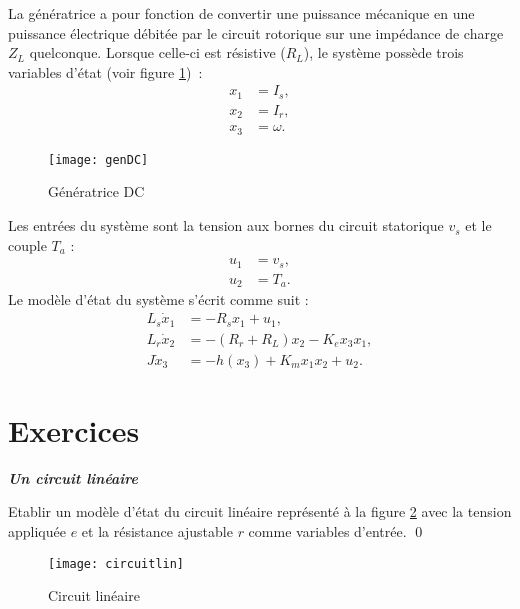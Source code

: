 La génératrice a pour fonction de convertir une puissance mécanique en une puissance électrique débitée par le circuit
rotorique sur une impédance de charge $Z_L$ quelconque. Lorsque celle-ci est
résistive ($R_L$),  le système possède trois variables d'état (voir figure
\ref{fig:genDC})~: 
\begin{equation*} \begin{split} 
x_1 &= I_s, \\ x_2 &= I_r, \\ x_3 &= \omega.
\end{split} \end{equation*}
\begin{figure}[htbp]
\begin{center}
\texttt{[image: genDC]}
\caption{Génératrice DC}
\label{fig:genDC}
\end{center}
\end{figure}
Les entrées du système sont la tension aux bornes du circuit statorique
$v_s$ et le couple $T_a$ :
\begin{equation*} \begin{split}
u_1 &= v_s, \\
u_2 &= T_a.
\end{split} \end{equation*}
Le modèle d'état du système s'écrit comme suit :
\begin{equation*} \begin{split}
L_s\dot x_1 &= -R_s x_1+ u_1, \\
L_r\dot x_2 &=  - (R_r +R_L) x_2 - K_e x_3 x_1,\\
J\dot x_3 &= -h(x_3) + K_m x_1x_2 + u_2.
\end{split} \end{equation*}


\section{Exercices}

\begin{exercice} {\bf \em Un circuit linéaire}

Etablir un modèle d'état du circuit linéaire représenté à la figure \ref{fig:circuitlin} avec la tension appliquée $e$ et la résistance ajustable $r$ comme variables d'entrée. \qed
 \begin{figure}[htbp]
\begin{center}
\texttt{[image: circuitlin]}
\caption{Circuit linéaire}
\label{fig:circuitlin}
\end{center}
\end{figure}

\end{exercice}
\vv

